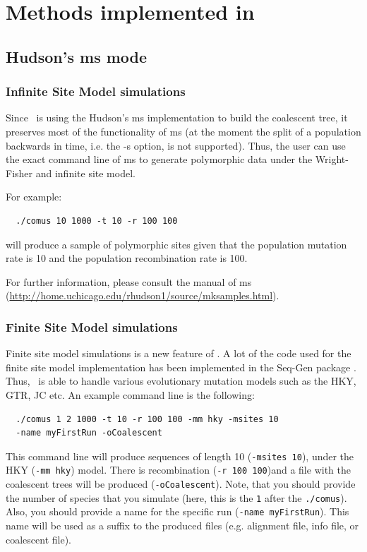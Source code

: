 \chapter{Methods implemented in \comus} %

\section{Hudson's ms mode}

\subsection{Infinite Site Model simulations}

Since \comus\ is using the Hudson's ms implementation to build the coalescent tree, it preserves most of the functionality of ms (at the moment the split of a population backwards in time, i.e. the -s option, is not supported). Thus, the user can use the exact command line of ms to generate polymorphic data under the Wright-Fisher and infinite site model. 

For example:

\begin{lstlisting}
  ./comus 10 1000 -t 10 -r 100 100
\end{lstlisting}

will produce a sample of polymorphic sites given that the population mutation rate is 10 and the population recombination rate is 100. 

For further information, please consult the manual of ms (\url{http://home.uchicago.edu/rhudson1/source/mksamples.html}).

\subsection{Finite Site Model simulations}

Finite site model simulations is a new feature of \comus.  A lot of the code used for the finite site model implementation has been implemented in the Seq-Gen package \citep{Rambaut1997}. Thus, \comus\ is able to handle various evolutionary mutation models such as the HKY, GTR, JC etc. An example command line is the following:

\begin{lstlisting}
  ./comus 1 2 1000 -t 10 -r 100 100 -mm hky -msites 10 
  -name myFirstRun -oCoalescent
\end{lstlisting}

This command line will produce sequences of length 10 (\verb!-msites 10!), under the HKY (\verb!-mm hky!) model. There is recombination (\verb!-r 100 100!)and a file with the coalescent trees will be produced (\verb!-oCoalescent!). Note, that you should provide the number of species that you simulate (here, this is the \verb!1! after the \verb!./comus!). Also, you should provide a name for the specific run (\verb!-name myFirstRun!). This name will be used as a suffix to the produced files (e.g. alignment file, info file, or coalescent file). 

